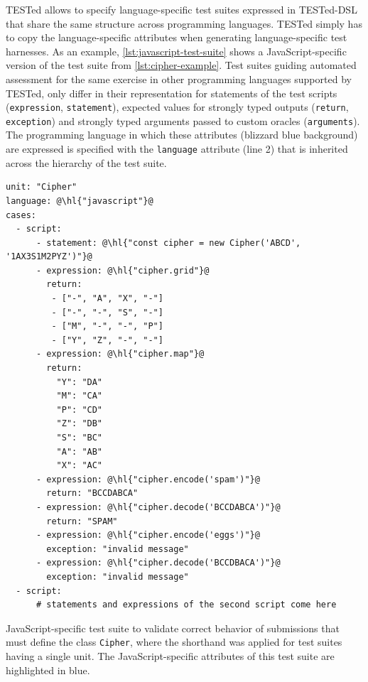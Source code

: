 \documentclass[../main]{subfiles}
\begin{document}
TESTed allows to specify language-specific test suites expressed in TESTed-DSL that share the same structure across programming languages.
TESTed simply has to copy the language-specific attributes when generating language-specific test harnesses.
As an example, \vref{lst:javascript-test-suite} shows a JavaScript-specific version of the test suite from \vref{lst:cipher-example}.
Test suites guiding automated assessment for the same exercise in other programming languages supported by TESTed, only differ in their representation for statements of the test scripts (\texttt{expression}, \texttt{statement}), expected values for strongly typed outputs (\texttt{return}, \texttt{exception}) and strongly typed arguments passed to custom oracles (\texttt{arguments}).
The programming language in which these attributes (blizzard blue background) are expressed is specified with the \texttt{language} attribute (line 2) that is inherited across the hierarchy of the test suite.

\begin{listing}
    \begin{verbatim}
unit: "Cipher"
language: @\hl{"javascript"}@
cases:
  - script:
      - statement: @\hl{"const cipher = new Cipher('ABCD', '1AX3S1M2PYZ')"}@
      - expression: @\hl{"cipher.grid"}@
        return:
         - ["-", "A", "X", "-"]
         - ["-", "-", "S", "-"]
         - ["M", "-", "-", "P"]
         - ["Y", "Z", "-", "-"]
      - expression: @\hl{"cipher.map"}@
        return:
          "Y": "DA"
          "M": "CA"
          "P": "CD"
          "Z": "DB"
          "S": "BC"
          "A": "AB"
          "X": "AC"
      - expression: @\hl{"cipher.encode('spam')"}@
        return: "BCCDABCA"
      - expression: @\hl{"cipher.decode('BCCDABCA')"}@
        return: "SPAM"
      - expression: @\hl{"cipher.encode('eggs')"}@
        exception: "invalid message"
      - expression: @\hl{"cipher.decode('BCCDBACA')"}@
        exception: "invalid message"
  - script:
      # statements and expressions of the second script come here
    \end{verbatim}
    \caption[]{
        JavaScript-specific test suite to validate correct behavior of submissions that must define the class \texttt{Cipher}, where the shorthand was applied for test suites having a single unit.
        The JavaScript-specific attributes of this test suite are highlighted in blue.
    }
    \label{lst:javascript-test-suite}
\end{listing}
\end{document}
